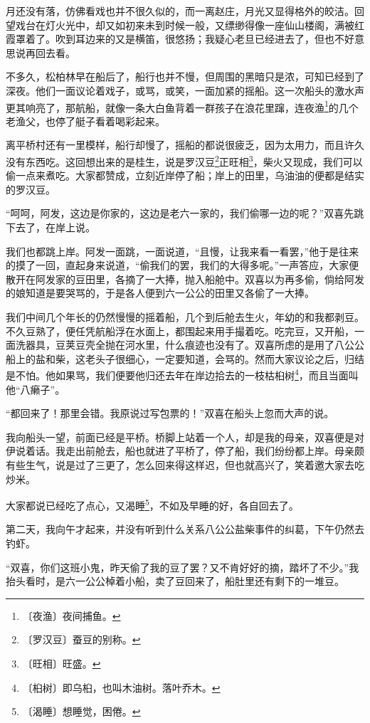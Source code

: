 \documentclass[12pt,UTF-8,openany]{ctexbook}
\begin{document}
\begin{large}
    月还没有落，仿佛看戏也并不很久似的，而一离赵庄，月光又显得格外的皎洁。回望戏台在灯火光中，却又如初来未到时候一般，又缥缈得像一座仙山楼阁，满被红霞罩着了。吹到耳边来的又是横笛，很悠扬；我疑心老旦已经进去了，但也不好意思说再回去看。
    
    不多久，松柏林早在船后了，船行也并不慢，但周围的黑暗只是浓，可知已经到了深夜。他们一面议论着戏子，或骂，或笑，一面加紧的摇船。这一次船头的激水声更其响亮了，那航船，就像一条大白鱼背着一群孩子在浪花里蹿，连夜渔\footnote{〔夜渔〕夜间捕鱼。}的几个老渔父，也停了艇子看着喝彩起来。
    
    离平桥村还有一里模样，船行却慢了，摇船的都说很疲乏，因为太用力，而且许久没有东西吃。这回想出来的是桂生，说是罗汉豆\footnote{〔罗汉豆〕蚕豆的别称。}正旺相\footnote{〔旺相〕旺盛。}，柴火又现成，我们可以偷一点来煮吃。大家都赞成，立刻近岸停了船；岸上的田里，乌油油的便都是结实的罗汉豆。
    
    “呵呵，阿发，这边是你家的，这边是老六一家的，我们偷哪一边的呢？”双喜先跳下去了，在岸上说。
    
    我们也都跳上岸。阿发一面跳，一面说道，“且慢，让我来看一看罢，”他于是往来的摸了一回，直起身来说道，“偷我们的罢，我们的大得多呢。”一声答应，大家便散开在阿发家的豆田里，各摘了一大捧，抛入船舱中。双喜以为再多偷，倘给阿发的娘知道是要哭骂的，于是各人便到六一公公的田里又各偷了一大捧。
    
    我们中间几个年长的仍然慢慢的摇着船，几个到后舱去生火，年幼的和我都剥豆。不久豆熟了，便任凭航船浮在水面上，都围起来用手撮着吃。吃完豆，又开船，一面洗器具，豆荚豆壳全抛在河水里，什么痕迹也没有了。双喜所虑的是用了八公公船上的盐和柴，这老头子很细心，一定要知道，会骂的。然而大家议论之后，归结是不怕。他如果骂，我们便要他归还去年在岸边拾去的一枝枯桕树\footnote{〔桕树〕即乌桕，也叫木油树。落叶乔木。}，而且当面叫他“八癞子”。
    
    “都回来了！那里会错。我原说过写包票的！”双喜在船头上忽而大声的说。
    
    我向船头一望，前面已经是平桥。桥脚上站着一个人，却是我的母亲，双喜便是对伊说着话。我走出前舱去，船也就进了平桥了，停了船，我们纷纷都上岸。母亲颇有些生气，说是过了三更了，怎么回来得这样迟，但也就高兴了，笑着邀大家去吃炒米。
    
    大家都说已经吃了点心，又渴睡\footnote{〔渴睡〕想睡觉，困倦。}，不如及早睡的好，各自回去了。
    
    第二天，我向午才起来，并没有听到什么关系八公公盐柴事件的纠葛，下午仍然去钓虾。
    
    “双喜，你们这班小鬼，昨天偷了我的豆了罢？又不肯好好的摘，踏坏了不少。”我抬头看时，是六一公公棹着小船，卖了豆回来了，船肚里还有剩下的一堆豆。
    

\end{large}
\end{document}
